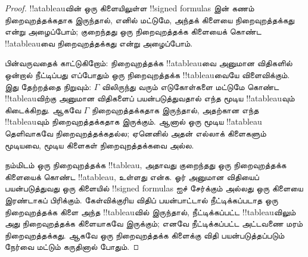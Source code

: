 \documentclass[../../../include/open-logic-section]{subfiles}
\begin{document}
\begin{proof}
!!a{tableau}வின் ஒரு கிளையிலுள்ள !!{signed formula}s இன் கணம்
நிறைவுறத்தக்கதாக இருந்தால், எனில் மட்டுமே, அந்தக் கிளையை நிறைவுறத்தக்கது
என்று அழைப்போம்; குறைந்தது ஒரு நிறைவுறத்தக்க கிளையைக் கொண்ட !!a{tableau}வை
நிறைவுறத்தக்கது என்று அழைப்போம்.

பின்வருவதைக் காட்டுகிறோம்: நிறைவுறத்தக்க !!a{tableau}வை அனுமான விதிகளில்
ஒன்றால் நீட்டிப்பது எப்போதும் ஒரு நிறைவுறத்தக்க !!{tableau}வையே விளைவிக்கும்.
இது தேற்றத்தை நிறுவும்: $\Gamma$ விலிருந்து வரும் எடுகோள்களை மட்டுமே கொண்ட
!!{tableau}விற்கு அனுமான விதிகளைப் பயன்படுத்துவதால் எந்த மூடிய
!!a{tableau}வும் கிடைக்கிறது. ஆகவே $\Gamma$ நிறைவுறத்தக்கதாக இருந்தால்,
அதற்கான எந்த !!{tableau}வும் நிறைவுறத்தக்கதாக இருக்கும். ஆனால் ஒரு மூடிய
!!a{tableau} தெளிவாகவே நிறைவுறத்தக்கதல்ல; ஏனெனில் அதன் எல்லாக் கிளைகளும்
மூடியவை, மூடிய கிளைகள் நிறைவுறத்தக்கவை அல்ல.

நம்மிடம் ஒரு நிறைவுறத்தக்க !!{tableau}, அதாவது குறைந்தது ஒரு
நிறைவுறத்தக்க கிளையைக் கொண்ட !!a{tableau}, உள்ளது என்க. ஓர் அனுமான விதியைப்
பயன்படுத்துவது ஒரு கிளையில் !!{signed formula}s ஐச் சேர்க்கும் அல்லது ஒரு
கிளையை இரண்டாகப் பிரிக்கும். கேள்விக்குரிய விதிப் பயன்பாட்டால் நீட்டிக்கப்படாத
ஒரு நிறைவுறத்தக்க கிளை அந்த !!{tableau}வில் இருந்தால், நீட்டிக்கப்பட்ட
!!{tableau}விலும் அது நிறைவுறத்தக்க கிளையாகவே இருக்கும்; எனவே நீட்டிக்கப்பட்ட
அட்டவணை மரம் நிறைவுறத்தக்கது. ஆகவே ஒரு நிறைவுறத்தக்க கிளைக்கு விதி
பயன்படுத்தப்படும் நேர்வை மட்டும் கருதினால் போதும்.


\end{proof}
\end{document}
